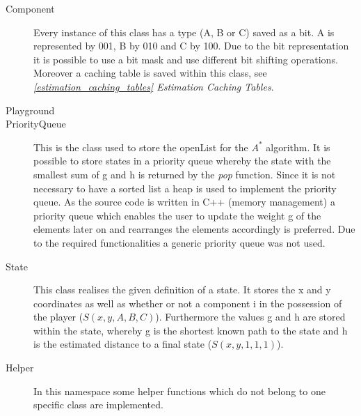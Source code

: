 \documentclass{article}
\begin{document}
\begin{description}
    \item[Component] Every instance of this class has a type (A, B or C) saved as a bit. A is represented by 001, B by 010 and C by 100. Due to the bit representation it is possible to use a bit mask and use different bit shifting operations. Moreover a caching table is saved within this class, see \textit{\ref{estimation_caching_tables} Estimation Caching Tables}.
    \item[Playground]
    \item[PriorityQueue] This is the class used to store the openList for the $A^*$ algorithm. It is possible to store states in a priority queue whereby the state with the smallest sum of g and h is returned by the \textit{pop} function. Since it is not necessary to have a sorted list a heap is used to implement the priority queue. As the source code is written in C++ (memory management) a priority queue which enables the user to update the weight g of the elements later on and rearranges the elements accordingly is preferred. Due to the required functionalities a generic priority queue was not used.
    \item[State] This class realises the given definition of a state. It stores the x and y coordinates as well as whether or not a component i in the possession of the player ($S(x,y,A,B,C)$). Furthermore the values g and h are stored within the state, whereby g is the shortest known path to the state and h is the estimated distance to a final state ($S(x,y,1,1,1)$).
    \item[Helper] In this namespace some helper functions which do not belong to one specific class are implemented.
\end{description}
\begin{comment}
\subsection{Klassen}
Artifact

playground
erzeugt durch einlesen der files, basic object
calculate path --> hauptfunction
getEstimate, unser H
bitmaske artifact
artifact, bitmaske 
\end{comment}
\end{document}
